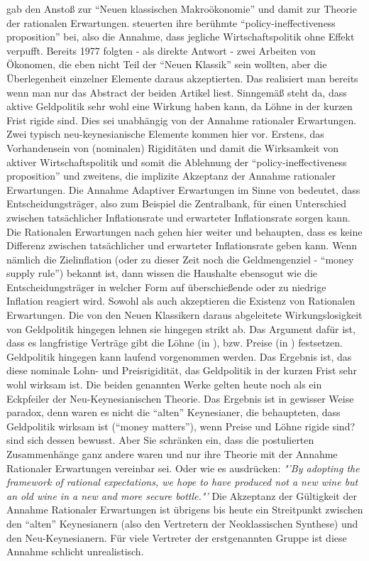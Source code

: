 \textcite{Lucas1976} gab den Anstoß zur "`Neuen klassischen Makroökonomie"' und damit zur Theorie der rationalen Erwartungen. \textcite{Sargent1975} steuerten ihre berühmte "`policy-ineffectiveness proposition"' bei, also die Annahme, dass jegliche Wirtschaftspolitik ohne Effekt verpufft. Bereits 1977 folgten - als direkte Antwort - zwei Arbeiten \textcite{Taylor1977, Fischer1977} von Ökonomen, die eben nicht Teil der "`Neuen Klassik"' sein wollten, aber die Überlegenheit einzelner Elemente daraus akzeptierten. Das realisiert man bereits wenn man nur das Abstract der beiden Artikel liest. Sinngemäß steht da, dass aktive Geldpolitik sehr wohl eine Wirkung haben kann, da Löhne in der kurzen Frist rigide sind. Dies sei unabhängig von der Annahme rationaler Erwartungen. Zwei typisch neu-keynesianische Elemente kommen hier vor. Erstens, das Vorhandensein von (nominalen) Rigiditäten und damit die Wirksamkeit von aktiver Wirtschaftspolitik und somit die Ablehnung der "`policy-ineffectiveness proposition"' und zweitens, die implizite Akzeptanz der Annahme rationaler Erwartungen.
Die Annahme Adaptiver Erwartungen im Sinne von \textcite{Phelps1968} bedeutet, dass Entscheidungsträger, also zum Beispiel die Zentralbank, für einen Unterschied zwischen tatsächlicher Inflationsrate und erwarteter Inflationsrate sorgen kann. Die Rationalen Erwartungen nach \textcite{Lucas1976} gehen hier weiter und behaupten, dass es keine Differenz zwischen tatsächlicher und erwarteter Inflationsrate geben kann. Wenn nämlich die Zielinflation (oder zu dieser Zeit noch die Geldmengenziel - "`money supply rule"') bekannt ist, dann wissen die Haushalte ebensogut wie die Entscheidungsträger in welcher Form auf überschießende oder zu niedrige Inflation reagiert wird.  Sowohl \textcite{Fischer1977} als auch \textcite{Taylor1977} akzeptieren die Existenz von Rationalen Erwartungen. Die von den Neuen Klassikern daraus abgeleitete Wirkungslosigkeit von Geldpolitik hingegen lehnen sie hingegen strikt ab. Das Argument dafür ist, dass es langfristige Verträge gibt die Löhne (in \textcite{Fischer1977}), bzw. Preise (in \textcite{Taylor1977}) festsetzen. Geldpolitik hingegen kann laufend vorgenommen werden. Das Ergebnis ist, das diese nominale Lohn- und Preisrigidität, das Geldpolitik in der kurzen Frist sehr wohl wirksam ist. Die beiden genannten Werke gelten heute noch als ein Eckpfeiler der Neu-Keynesianischen Theorie. Das Ergebnis ist in gewisser Weise paradox, denn waren es nicht die "`alten"' Keynesianer, die behaupteten, dass Geldpolitik wirksam ist ("`money matters"'), wenn Preise und Löhne rigide sind? \textcite[S. 166]{Taylor1977} sind sich dessen bewusst. Aber Sie schränken ein, dass die postulierten Zusammenhänge ganz andere waren und nur ihre Theorie mit der Annahme Rationaler Erwartungen vereinbar sei. Oder wie es \textcite[S. 166]{Taylor1977} ausdrücken: \textit{"'By adopting the framework of rational expectations, we hope to have produced not a new wine but an old wine in a new and more secure bottle."'}
Die Akzeptanz der Gültigkeit der Annahme Rationaler Erwartungen ist übrigens bis heute ein Streitpunkt zwischen den "`alten"' Keynesianern (also den Vertretern der Neoklassischen Synthese) und den Neu-Keynesianern. Für viele Vertreter der erstgenannten Gruppe ist diese Annahme schlicht unrealistisch.

